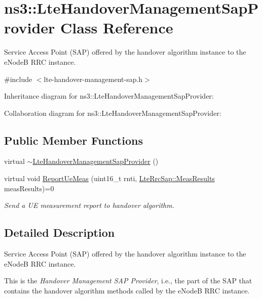 \hypertarget{classns3_1_1LteHandoverManagementSapProvider}{}\section{ns3\+:\+:Lte\+Handover\+Management\+Sap\+Provider Class Reference}
\label{classns3_1_1LteHandoverManagementSapProvider}


Service Access Point (S\+AP) offered by the handover algorithm instance to the e\+NodeB R\+RC instance.  




{\ttfamily \#include $<$lte-\/handover-\/management-\/sap.\+h$>$}



Inheritance diagram for ns3\+:\+:Lte\+Handover\+Management\+Sap\+Provider\+:


Collaboration diagram for ns3\+:\+:Lte\+Handover\+Management\+Sap\+Provider\+:
\subsection*{Public Member Functions}
\begin{DoxyCompactItemize}
\item 
virtual \hyperlink{classns3_1_1LteHandoverManagementSapProvider_af829693f28a3acf14ca041e2d9f826c0}{$\sim$\+Lte\+Handover\+Management\+Sap\+Provider} ()
\item 
virtual void \hyperlink{classns3_1_1LteHandoverManagementSapProvider_a5daca6a055e4f8794f7f1e8ba1077b15}{Report\+Ue\+Meas} (uint16\+\_\+t rnti, \hyperlink{structns3_1_1LteRrcSap_1_1MeasResults}{Lte\+Rrc\+Sap\+::\+Meas\+Results} meas\+Results)=0
\begin{DoxyCompactList}\small\item\em Send a UE measurement report to handover algorithm. \end{DoxyCompactList}\end{DoxyCompactItemize}


\subsection{Detailed Description}
Service Access Point (S\+AP) offered by the handover algorithm instance to the e\+NodeB R\+RC instance. 

This is the {\itshape Handover Management S\+AP Provider}, i.\+e., the part of the S\+AP that contains the handover algorithm methods called by the e\+NodeB R\+RC instance. 


